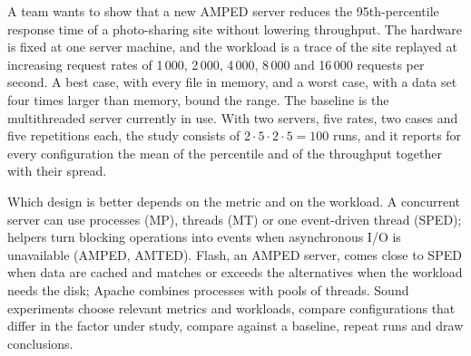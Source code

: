 \documentclass[../main.tex]{subfiles}
\begin{document}
\begin{example}
  A team wants to show that a new AMPED server reduces the 95th-percentile
  response time of a photo-sharing site without lowering throughput.  The
  hardware is fixed at one server machine, and the workload is a trace of
  the site replayed at increasing request rates of 1\,000, 2\,000, 4\,000,
  8\,000 and 16\,000 requests per second.  A best case, with every file in
  memory, and a worst case, with a data set four times larger than memory,
  bound the range.  The baseline is the multithreaded server currently in
  use.  With two servers, five rates, two cases and five repetitions each,
  the study consists of $2 \cdot 5 \cdot 2 \cdot 5 = 100$ runs, and it
  reports for every configuration the mean of the percentile and of the
  throughput together with their spread.
\end{example}

\begin{keypoint}
  Which design is better depends on the metric and on the workload.  A
  concurrent server can use processes (MP), threads (MT) or one
  event-driven thread (SPED); helpers turn blocking operations into events
  when asynchronous I/O is unavailable (AMPED, AMTED).  Flash, an AMPED
  server, comes close to SPED when data are cached and matches or exceeds
  the alternatives when the workload needs the disk; Apache combines
  processes with pools of threads.  Sound experiments choose relevant
  metrics and workloads, compare configurations that differ in the factor
  under study, compare against a baseline, repeat runs and draw conclusions.
\end{keypoint}
\end{document}

